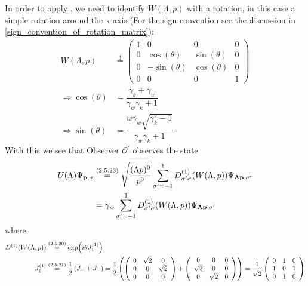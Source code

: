 \begin{widetext}
	In order to apply , we need to identify $W(\Lambda,p)$ with a rotation, in this case a simple rotation around the  x-axis (For the sign convention see the discussion in \ref{sign_convention_of_rotation_matrix}):
	\begin{align*}
		W(\Lambda,p)&\overset{!}{=}
		\left(\begin{array}{cccc}
			1 & 0 & 0 & 0 \\
			0 &  \cos(\theta)&  \sin(\theta)& 0 \\
			0 & -\sin(\theta) &  \cos(\theta)& 0 \\
			0 & 0 & 0 & 1
		\end{array}\right)\\
		\Rightarrow\cos(\theta)&=\dfrac{\gamma_k+\gamma_w}{\gamma_w \gamma_k+1}\\
		\Rightarrow\sin(\theta)&=\dfrac{w\gamma_w\sqrt{\gamma_k^2-1}}{\gamma_w \gamma_k+1}
	\end{align*}
	With this we see that Observer $\mathcal{O}^\prime$ observes the state
	\begin{align*}
		U(\Lambda)\Psi_{\mathbf{p},\sigma}&\overset{({2.5.23})}{=}\sqrt{\dfrac{(\Lambda p)^0}{p^0}}\sum\limits_{\sigma^\prime=-1}^{1}D^{(1)}_{\sigma^\prime \sigma}(W(\Lambda,p))\Psi_{\mathbf{\Lambda p},\sigma^\prime}\\
		&=\gamma_w\sum\limits_{\sigma^\prime=-1}^{1}D^{(1)}_{\sigma^\prime \sigma}(W(\Lambda,p))\Psi_{\mathbf{\Lambda p},\sigma^\prime}
	\end{align*}
	where
	\begin{align*}
		D^{(1)}(W(\Lambda,p))&\overset{\eqc{2.5.20}}{=}\exp(i\theta J_1^{(1)})\\
		J_1^{(1)}&\overset{\eqc{2.5.21}}{=}\dfrac{1}{2}\left(J_++J_-\right)=
		\dfrac{1}{2}\left(
		\left(\begin{array}{ccc}
			0&  \sqrt{2}& 0 \\
			0&  0& \sqrt{2}\\
			0&  0& 0
		\end{array}\right)+
		\left(\begin{array}{ccc}
		0&  0& 0 \\
		\sqrt{2}&  0& 0 \\
		0&  \sqrt{2}& 0
		\end{array}\right)
		\right)=\dfrac{1}{\sqrt{2}}
		\left(\begin{array}{ccc}
			0&  1& 0 \\
			1&  0& 1 \\
			0&  1& 0
		\end{array}\right)\\

\end{align*}
\end{widetext}
